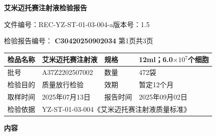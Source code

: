 \documentclass[UTF8,10pt,a4paper,fontset=fandol]{ctexart}
\newcommand{\fieldvalue}[1]{#1}
\begin{document}
\begin{center}
{\large \textbf{艾米迈托赛注射液检验报告}}
\end{center}

\noindent
文件编号：REC-YZ-ST-01-03-004-a\hfill 版本号：1.5

\medskip

\noindent
检验报告编号：
\fieldvalue{\textbf{C30420250902034}}
\qquad 第1页共3页

\small
\begin{tabularx}{\textwidth}{|>{\centering\arraybackslash}p{3.0cm}|X|>{\centering\arraybackslash}p{2.2cm}|X|}
\hline
检品名称 &
\fieldvalue{艾米迈托赛注射液}
&
规格 &
\fieldvalue{12ml；6.0$\times 10^{7}$个细胞}
\\
\hline
批号 &
\fieldvalue{A37Z2202507002}
&
数量 &
\fieldvalue{472袋}
\\
\hline
检验目的 &
\fieldvalue{质量放行检验}
&
效期 &
\fieldvalue{暂定12个月}
\\
\hline
取样时间 &
\fieldvalue{2025年07月13日}
&
报告时间 &
\fieldvalue{2025年09月02日}
\\
\hline
检验依据 &
\multicolumn{3}{l|}{
\fieldvalue{YZ-ST-01-03-004《艾米迈托赛注射液质量标准》}
}
\\
\hline
\end{tabularx}

\begin{center}
\textbf{内容}
\end{center}
\end{document}
